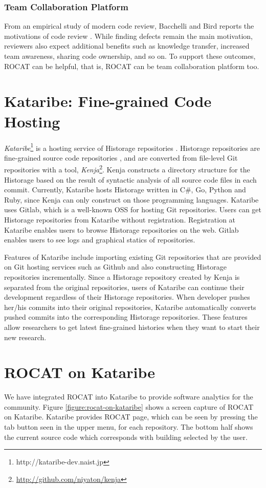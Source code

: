 \documentclass[conference]{IEEEtran}
\newcommand{\figref}[1]{Figure \ref{#1}}
\begin{document}
\subsubsection{Team Collaboration Platform}
From an empirical study of modern code review, Bacchelli and Bird reports the motivations of code review \cite{Bacchelli:2013:EOC:2486788.2486882}. While finding defects remain the main motivation, reviewers also expect additional benefits such as knowledge transfer, increased team awareness, sharing code ownership, and so on.
To support these outcomes, ROCAT can be helpful, that is, ROCAT can be team collaboration platform too.

\section{Kataribe: Fine-grained Code Hosting}
\textit{Kataribe}\footnote{http://kataribe-dev.naist.jp} is a hosting service of Historage repositories \cite{Fujiwara:2014:KHS:2597073.2597125}.
Historage repositories are fine-grained source code repositories \cite{Hata:2011:HFV:2024445.2024463}, and are converted from file-level Git repositories with a tool, \textit{Kenja}\footnote{\url{http://github.com/niyaton/kenja}}.
Kenja constructs a directory structure for the Historage based on the result of syntactic analysis of all source code files in each commit.
Currently, Kataribe hosts Historage written in C\#, Go, Python and Ruby, since Kenja can only construct on those programming languages.
Kataribe uses Gitlab, which is a well-known OSS for hosting Git repositories.
Users can get Historage repositories from Kataribe without registration.
Registration at Kataribe enables users to browse Historage repositories on the web.
Gitlab enables users to see logs and graphical statics of repositories.

Features of Kataribe include importing existing Git repositories that are provided on Git hosting services such as Github and also constructing Historage repositories incrementally.
Since a Historage repository created by Kenja is separated from the original repositories, users of Kataribe can continue their development regardless of their Historage repositories.
When developer pushes her/his commits into their original repositories, Kataribe automatically converts pushed commits into the corresponding Historage repositories.
These features allow researchers to get latest fine-grained histories when they want to start their new research.

\section{ROCAT on Kataribe}
We have integrated ROCAT into Kataribe to provide software analytics for the community.
\figref{figure:rocat-on-kataribe} shows a screen capture of ROCAT on Kataribe.
Kataribe provides ROCAT page, which can be seen by pressing the tab button seen in the upper menu, for each repository.
The bottom half shows the current source code which corresponds with building selected by the user.
\end{document}
